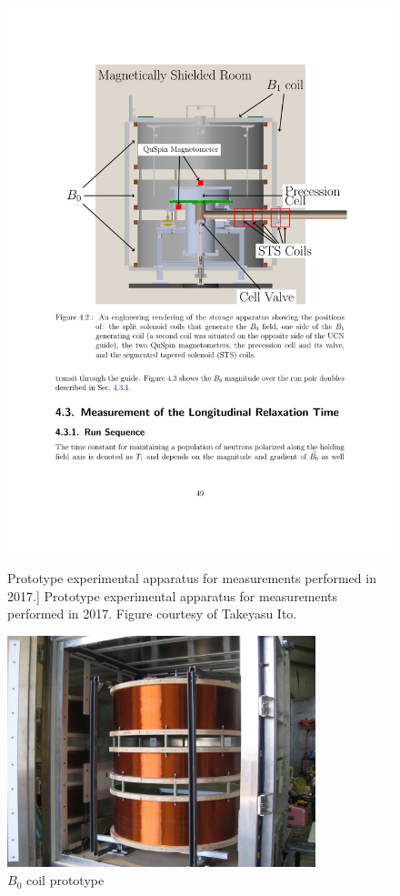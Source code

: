 \begin{figure}
\centering
\begin{minipage}{.5\textwidth}
    \centering
    \includegraphics[width=\textwidth]{figures/ramsey2017_apparatus.pdf}
    \caption
    [Prototype experimental apparatus for measurements performed in 2017.]
    {Prototype experimental apparatus for measurements performed in 2017. Figure courtesy of Takeyasu Ito.}
    \label{fig:ramsey_2017_apparatus}
\end{minipage}%
\begin{minipage}{.5\textwidth}
    \centering
    \includegraphics[width=0.8\textwidth]{figures/ramsey2017_B0_coil.jpg}
    \caption
    {$B_0$ coil prototype}
    \label{fig:ramsey_2017_B0_coil_prototype}
\end{minipage}
\end{figure}

